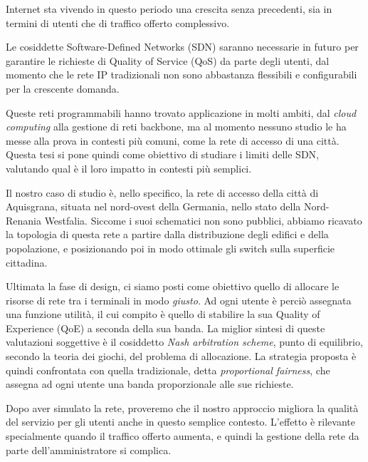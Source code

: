 
Internet sta vivendo in questo periodo una crescita senza precedenti, sia in
termini di utenti che di traffico offerto complessivo.

Le cosiddette Software-Defined Networks (SDN) saranno necessarie in futuro per
garantire le richieste di Quality of Service (QoS) da parte degli utenti, dal
momento che le rete IP tradizionali non sono abbastanza flessibili e
configurabili per la crescente domanda.

Queste reti programmabili hanno trovato applicazione in molti ambiti, dal
\emph{cloud computing} alla gestione di reti backbone, ma al momento nessuno
studio le ha messe alla prova in contesti più comuni, come la rete di accesso di
una città. Questa tesi si pone quindi come obiettivo di studiare i limiti delle
SDN, valutando qual è il loro impatto in contesti più semplici.

\smallskip

Il nostro caso di studio è, nello specifico, la rete di accesso della città di
Aquisgrana, situata nel nord-ovest della Germania, nello stato della
Nord-Renania Westfalia. %
%
Siccome i suoi schematici non sono pubblici, abbiamo ricavato la topologia di
questa rete a partire dalla distribuzione degli edifici e della popolazione, e
posizionando poi in modo ottimale gli switch sulla superficie cittadina.

Ultimata la fase di design, ci siamo posti come obiettivo quello di allocare le
risorse di rete tra i terminali in modo \emph{giusto}.
%
Ad ogni utente è perciò assegnata una funzione utilità, il cui compito è quello
di stabilire la sua Quality of Experience (QoE) a seconda della sua banda.
%
La miglior sintesi di queste valutazioni soggettive è il cosiddetto \emph{Nash
arbitration scheme}, punto di equilibrio, secondo la teoria dei giochi, del
problema di allocazione.
%
La strategia proposta è quindi confrontata con quella tradizionale, detta
\emph{proportional fairness}, che assegna ad ogni utente una banda proporzionale
alle sue richieste.

Dopo aver simulato la rete, proveremo che il nostro approccio migliora la
qualità del servizio per gli utenti anche in questo semplice
contesto. L'effetto è rilevante specialmente quando il traffico offerto aumenta,
e quindi la gestione della rete da parte dell'amministratore si complica.

